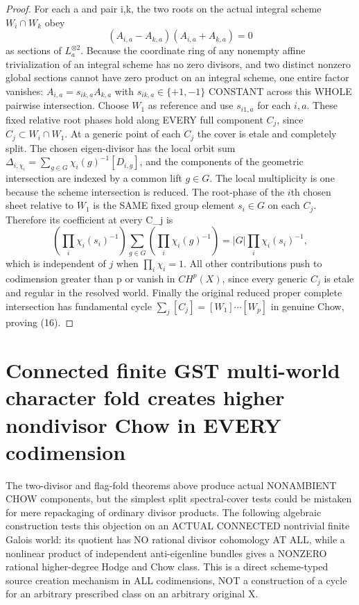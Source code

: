 \documentclass[11pt]{article}
\begin{document}
\begin{proof}
For each a and pair i,k, the two roots
on the actual integral scheme $W_i\cap W_k$
obey
\[
 (A_{i,a}-A_{k,a})(A_{i,a}+A_{k,a})=0
\]
as sections of $L_a^{\otimes2}$.
Because the coordinate ring of any
nonempty affine trivialization of an
integral scheme has no zero divisors,
and two distinct nonzero global
sections cannot have zero product
on an integral scheme, one entire
factor vanishes: $A_{i,a}=
s_{ik,a}A_{k,a}$ with
$s_{ik,a}\in\{+1,-1\}$ CONSTANT
across this WHOLE pairwise intersection.
Choose $W_1$ as reference and use
$s_{i1,a}$ for each $i,a$.
These fixed relative root phases
hold along EVERY full component $C_j$,
since $C_j\subset W_i\cap W_1$.
At a generic point of each $C_j$
the cover is etale and completely split.
The chosen eigen-divisor has the local
orbit sum
$\Delta_{i,\chi_i}=
  \sum_{g\in G}\chi_i(g)^{-1}[D_{i,g}]$,
and the components of the geometric
intersection are indexed by
a common lift $g\in G$. The local
multiplicity is one because the
scheme intersection is reduced.
The root-phase of the $i$th chosen
sheet relative to $W_1$ is the
SAME fixed group element $s_i\in G$
on each $C_j$. Therefore its coefficient
at every C_j is
\[
 \left(\prod_i\chi_i(s_i)^{-1}\right)
     \sum_{g\in G}
           \left(\prod_i\chi_i(g)^{-1}\right)
 =|G|\prod_i\chi_i(s_i)^{-1},
\]
which is independent of $j$ when
$\prod_i\chi_i=1$.
All other contributions push to
codimension greater than p or vanish
in $CH^p(X)$, since every generic
$C_j$ is etale and regular in the
resolved world.
Finally the original reduced proper
complete intersection has fundamental
cycle $\sum_j[C_j]=[W_1]\cdots[W_p]$
in genuine Chow, proving (16).
\end{proof}


\section{Connected finite GST multi-world character fold creates higher nondivisor Chow in EVERY codimension}
The two-divisor and flag-fold theorems above produce actual
NONAMBIENT CHOW components, but the simplest split spectral-cover
tests could be mistaken for mere repackaging of ordinary divisor
products. The following algebraic construction tests this objection
on an ACTUAL CONNECTED nontrivial finite Galois world:
its quotient has NO rational divisor cohomology AT ALL,
while a nonlinear product of independent anti-eigenline bundles
gives a NONZERO rational higher-degree Hodge and Chow class.
This is a direct scheme-typed source creation mechanism in ALL
codimensions, NOT a construction of a cycle for an arbitrary
prescribed class on an arbitrary original X.
\end{document}
